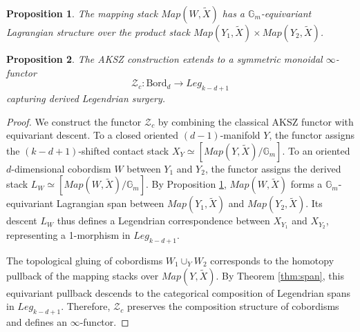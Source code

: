 \documentclass[10pt,a4paper]{amsart}
\newtheorem{proposition}{Proposition}
\newcommand{\Gm}{\mathbb{G}_m}
\begin{document}
\begin{proposition}\label{prop:equiv_mapping_stack}
The mapping stack $Map(W, \widetilde{X})$ has a $\Gm$-equivariant Lagrangian structure over the product stack $Map(Y_{1}, \widetilde{X}) \times Map(Y_{2}, \widetilde{X})$.
\end{proposition}

\begin{proposition} \label{prop:AKSZ}
The AKSZ construction extends to a symmetric monoidal $\infty$-functor \[ \mathcal{Z}_{c} \colon \mathrm{Bord}_d \to Leg_{k-d+1} \] capturing derived Legendrian surgery.
\end{proposition}

\begin{proof}
We construct the functor $\mathcal{Z}_{c}$ by combining the classical AKSZ functor with equivariant descent. To a closed oriented $(d-1)$-manifold $Y$, the functor assigns the $(k-d+1)$-shifted contact stack $X_Y \simeq [Map(Y, \widetilde{X}) / \Gm]$. To an oriented $d$-dimensional cobordism $W$ between $Y_1$ and $Y_2$, the functor assigns the derived stack $L_W \simeq [Map(W, \widetilde{X}) / \Gm]$. By Proposition \ref{prop:equiv_mapping_stack}, $Map(W, \widetilde{X})$ forms a $\Gm$-equivariant Lagrangian span between $Map(Y_1, \widetilde{X})$ and $Map(Y_2, \widetilde{X})$. Its descent $L_W$ thus defines a Legendrian correspondence between $X_{Y_1}$ and $X_{Y_2}$, representing a 1-morphism in $Leg_{k-d+1}$.

The topological gluing of cobordisms $W_1 \cup_Y W_2$ corresponds to the homotopy pullback of the mapping stacks over $Map(Y, \widetilde{X})$. By Theorem \ref{thm:span}, this equivariant pullback descends to the categorical composition of Legendrian spans in $Leg_{k-d+1}$. Therefore, $\mathcal{Z}_{c}$ preserves the composition structure of cobordisms and defines an $\infty$-functor.

\end{proof}
\end{document}
